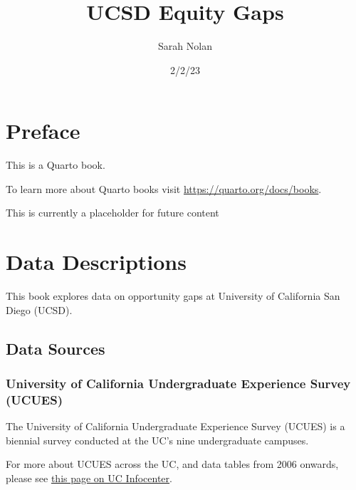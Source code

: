 \documentclass[
  letterpaper,
  DIV=11,
  numbers=noendperiod]{scrreprt}
\title{UCSD Equity Gaps}
\author{Sarah Nolan}
\date{2/2/23}
\renewcommand*\contentsname{Table of contents}
\newcommand\contentsname{Table of contents}
\begin{document}
\maketitle
\ifdefined\Shaded\renewenvironment{Shaded}{\begin{tcolorbox}[borderline west={3pt}{0pt}{shadecolor}, boxrule=0pt, sharp corners, enhanced, interior hidden, frame hidden, breakable]}{\end{tcolorbox}}\fi

\renewcommand*\contentsname{Table of contents}
{
\hypersetup{linkcolor=}
\setcounter{tocdepth}{2}
\tableofcontents
}

\hypertarget{preface}{%
\chapter*{Preface}\label{preface}}


This is a Quarto book.

To learn more about Quarto books visit
\url{https://quarto.org/docs/books}.

This is currently a placeholder for future content


\hypertarget{data-descriptions}{%
\chapter{Data Descriptions}\label{data-descriptions}}

This book explores data on opportunity gaps at University of California
San Diego (UCSD).

\hypertarget{data-sources}{%
\section{Data Sources}\label{data-sources}}

\hypertarget{sec-UCUES}{%
\subsection{University of California Undergraduate Experience Survey
(UCUES)}\label{sec-UCUES}}

The University of California Undergraduate Experience Survey (UCUES) is
a biennial survey conducted at the UC's nine undergraduate campuses.

For more about UCUES across the UC, and data tables from 2006 onwards,
please see
\href{https://www.universityofcalifornia.edu/about-us/information-center/ucues-data-tables-main}{this
page on UC Infocenter}.
\end{document}
